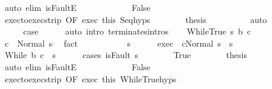 \begin{isabellebody}
\ {\isacharparenleft}auto\ elim{\isacharcolon}\ isFaultE{\isacharparenright}\isanewline
\ \ \ \ \isamarkupfalse%
\isanewline
\ \ \ \ \ \ \isamarkupfalse%
\ False\isanewline
\ \ \ \ \ \ \isamarkupfalse%
\ exec{\isacharunderscore}to{\isacharunderscore}exec{\isacharunderscore}strip\ {\isacharbrackleft}OF\ exec\ this{\isacharbrackright}\ Seq{\isachardot}hyps\isanewline
\ \ \ \ \ \ \isamarkupfalse%
\ {\isacharquery}thesis\isanewline
\ \ \ \ \ \ \ \ \isamarkupfalse%
\ auto\isanewline
\ \ \ \ \isamarkupfalse%
\isanewline
\ \ \isacommand{{\isacharbraceright}}\isamarkupfalse%
\isanewline
\ \ \isamarkupfalse%
\ \isamarkupfalse%
\ {\isacharquery}case\isanewline
\ \ \ \ \isamarkupfalse%
\ {\isacharparenleft}auto\ intro{\isacharcolon}\ terminates{\isachardot}intros{\isacharparenright}\isanewline
{}\isamarkupfalse%
\isanewline
\ \ \isamarkupfalse%
\ {\isacharparenleft}WhileTrue\ s\ b\ c{\isacharparenright}\isanewline
\ \ \isamarkupfalse%
\ {\isachardoublequoteopen}{\isasymGamma}{\isasymturnstile}c\ {\isasymdown}\ Normal\ s{\isachardoublequoteclose}\ \isamarkupfalse%
\ fact\isanewline
\ \ \isamarkupfalse%
\isanewline
\ \ \isacommand{{\isacharbraceleft}}\isamarkupfalse%
\isanewline
\ \ \ \ \isamarkupfalse%
\ s{\isacharprime}\isanewline
\ \ \ \ \isamarkupfalse%
\ exec{\isacharcolon}\ {\isachardoublequoteopen}{\isasymGamma}{\isasymturnstile}\ {\isasymlangle}c{\isacharcomma}Normal\ s{\isasymrangle}\ {\isasymRightarrow}\ s{\isacharprime}{\isachardoublequoteclose}\isanewline
\ \ \ \ \isamarkupfalse%
\ {\isachardoublequoteopen}{\isasymGamma}{\isasymturnstile}While\ b\ c\ {\isasymdown}\ s{\isacharprime}{\isachardoublequoteclose}\isanewline
\ \ \ \ \isamarkupfalse%
\ {\isacharparenleft}cases\ {\isachardoublequoteopen}isFault\ s{\isacharprime}{\isachardoublequoteclose}{\isacharparenright}\isanewline
\ \ \ \ \ \ \isamarkupfalse%
\ True\isanewline
\ \ \ \ \ \ \isamarkupfalse%
\ {\isacharquery}thesis\isanewline
\ \ \ \ \ \ \ \ \isamarkupfalse%
\ {\isacharparenleft}auto\ elim{\isacharcolon}\ isFaultE{\isacharparenright}\isanewline
\ \ \ \ \isamarkupfalse%
\isanewline
\ \ \ \ \ \ \isamarkupfalse%
\ False\isanewline
\ \ \ \ \ \ \isamarkupfalse%
\ exec{\isacharunderscore}to{\isacharunderscore}exec{\isacharunderscore}strip\ {\isacharbrackleft}OF\ exec\ this{\isacharbrackright}\ WhileTrue{\isachardot}hyps\isanewline

\end{isabellebody}
